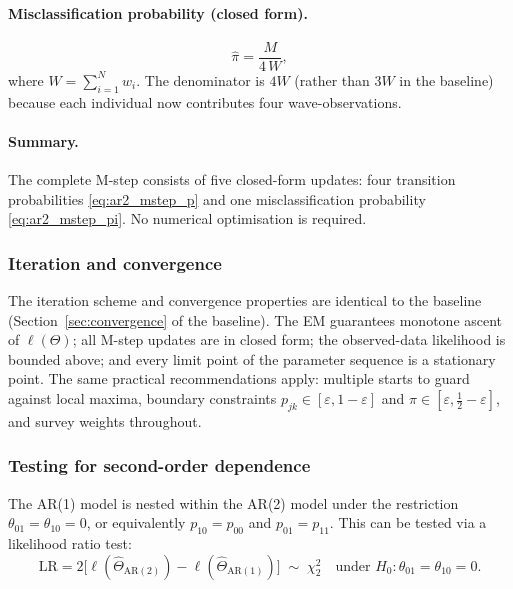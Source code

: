 \paragraph{Misclassification probability (closed form).}
\begin{equation}
\hat{\pi} = \frac{M}{4\,W},
\label{eq:ar2_mstep_pi}
\end{equation}
where $W = \sum_{i=1}^{N} w_i$. The denominator is $4W$ (rather than
$3W$ in the baseline) because each individual now contributes four
wave-observations.

\paragraph{Summary.} The complete M-step consists of five closed-form
updates: four transition probabilities
\eqref{eq:ar2_mstep_p} and one misclassification probability
\eqref{eq:ar2_mstep_pi}. No numerical optimisation is required.

\subsubsection{Iteration and convergence}

The iteration scheme and convergence properties are identical to the
baseline (Section~\ref{sec:convergence} of the baseline). The EM
guarantees monotone ascent of $\ell(\Theta)$; all M-step updates are in
closed form; the observed-data likelihood is bounded above; and every
limit point of the parameter sequence is a stationary point. The same
practical recommendations apply: multiple starts to guard against local
maxima, boundary constraints
$p_{jk} \in [\varepsilon, 1 - \varepsilon]$ and
$\pi \in [\varepsilon, \tfrac{1}{2} - \varepsilon]$, and survey weights
throughout.

\subsubsection{Testing for second-order dependence}

The AR(1) model is nested within the AR(2) model under the restriction
$\theta_{01} = \theta_{10} = 0$, or equivalently
$p_{10} = p_{00}$ and $p_{01} = p_{11}$. This can be tested via a
likelihood ratio test:
\begin{equation}
\mathrm{LR} = 2\big[\ell(\hat\Theta_{\mathrm{AR(2)}})
  - \ell(\hat\Theta_{\mathrm{AR(1)}})\big]
\;\sim\; \chi^2_2 \quad \text{under } H_0: \theta_{01} = \theta_{10} = 0.
\label{eq:ar2_lr_test}
\end{equation}

